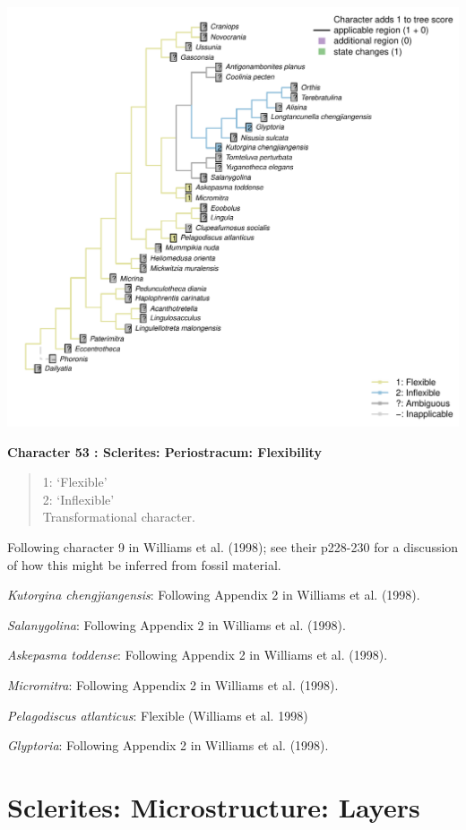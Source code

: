 \documentclass[]{book}
\theoremstyle{definition}
\theoremstyle{definition}
\theoremstyle{definition}
\theoremstyle{remark}
\begin{document}
\includegraphics{Brachiopod_phylogeny_files/figure-latex/unnamed-chunk-5-53.pdf}

\textbf{Character 53 : Sclerites: Periostracum: Flexibility }

\begin{quote}
1: `Flexible'\\
2: `Inflexible'\\
Transformational character.
\end{quote}

Following character 9 in Williams et al. (1998); see their p228-230 for
a discussion of how this might be inferred from fossil material.

\emph{Kutorgina chengjiangensis}: Following Appendix 2 in Williams et
al. (1998).

\emph{Salanygolina}: Following Appendix 2 in Williams et al. (1998).

\emph{Askepasma toddense}: Following Appendix 2 in Williams et al.
(1998).

\emph{Micromitra}: Following Appendix 2 in Williams et al. (1998).

\emph{Pelagodiscus atlanticus}: Flexible (Williams et al. 1998)

\emph{Glyptoria}: Following Appendix 2 in Williams et al. (1998).

\hypertarget{sclerites-microstructure-layers}{%
\section*{Sclerites: Microstructure:
Layers}\label{sclerites-microstructure-layers}}
\end{document}
